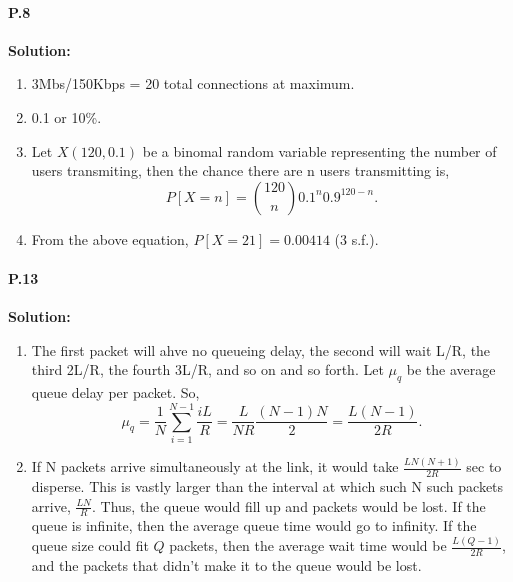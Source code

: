 \documentclass[12pt]{article}
\begin{document}
                                                                                                                                         
\paragraph{P.8\\}                                                                                                                                                      
\textbf{Solution:}
\begin{enumerate}[label = \alph*)]
\item 3Mbs/150Kbps = 20 total connections at maximum.
\item 0.1 or 10\%.
\item Let $X(120, 0.1)$ be a binomal random variable representing the number of users transmiting, then the chance there are n users transmitting is,\\
$$P[X = n] = {120 \choose n}0.1^n0.9^{120-n}.$$
\item From the above equation, $P[X=21] = 0.00414$ (3 s.f.).
\end{enumerate}

                                                                                                                                              
\paragraph{P.13\\}                                                                                                                                                     
\textbf{Solution:}
\begin{enumerate}[label = \alph*)]
\item The first packet will ahve no queueing delay, the second will wait L/R, the third 2L/R, the fourth 3L/R, and so on and so forth. Let $\mu_q$ be  the average queue delay per packet. So,\\
$$\mu_q = \frac{1}{N}\sum_{i = 1}^{N-1}\frac{iL}{R} =\frac{L}{NR}\frac{(N-1)N}{2} = \frac{L(N-1)}{2R}. $$
\item If N packets arrive simultaneously at the link, it would take $\frac{LN(N+1)}{2R}$ sec to disperse. This is vastly larger than the interval at which such N such packets arrive, $\frac{LN}{R}$. Thus, the queue would fill up and packets would be lost. If the queue is infinite, then the average queue time would go to infinity. If the queue size could fit $Q$ packets, then the average wait time would be $\frac{L(Q-1)}{2R}$, and the packets that didn't make it to the queue would be lost.
\end{enumerate}
\end{document}
